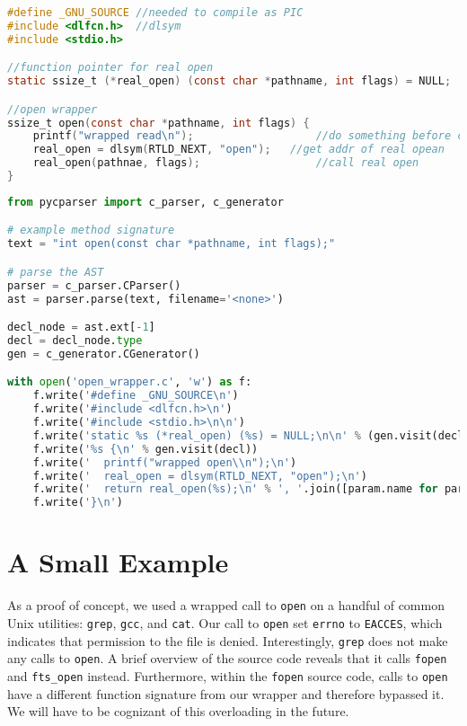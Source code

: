 \documentclass[10pt]{article}
\begin{document}
\begin{lstlisting}[caption=\texttt{open} wrapper, language=C]
#define _GNU_SOURCE	//needed to compile as PIC
#include <dlfcn.h>	//dlsym
#include <stdio.h>

//function pointer for real open
static ssize_t (*real_open) (const char *pathname, int flags) = NULL;

//open wrapper
ssize_t open(const char *pathname, int flags) {
	printf("wrapped read\n");					//do something before calling real open
	real_open = dlsym(RTLD_NEXT, "open"); 	//get addr of real opean
	real_open(pathnae, flags);					//call real open
}
\end{lstlisting}
\begin{lstlisting}[caption=\texttt{gen\_open\_wrapper.py}  Generates code identical to Listing 1, language=Python]
from pycparser import c_parser, c_generator

# example method signature
text = "int open(const char *pathname, int flags);"

# parse the AST
parser = c_parser.CParser()
ast = parser.parse(text, filename='<none>')

decl_node = ast.ext[-1]
decl = decl_node.type
gen = c_generator.CGenerator()

with open('open_wrapper.c', 'w') as f:
    f.write('#define _GNU_SOURCE\n')
    f.write('#include <dlfcn.h>\n')
    f.write('#include <stdio.h>\n\n')
    f.write('static %s (*real_open) (%s) = NULL;\n\n' % (gen.visit(decl.type), ', '.join([gen.visit(param) for param in decl.args.params])))
    f.write('%s {\n' % gen.visit(decl))
    f.write('  printf("wrapped open\\n");\n')
    f.write('  real_open = dlsym(RTLD_NEXT, "open");\n')
    f.write('  return real_open(%s);\n' % ', '.join([param.name for param in decl.args.params]))
    f.write('}\n')
\end{lstlisting}


\section{A Small Example}
As a proof of concept, we used a wrapped call to \texttt{open} on a handful of common Unix utilities: \texttt{grep}, \texttt{gcc}, and \texttt{cat}. Our call to \texttt{open} set \texttt{errno} to \texttt{EACCES}, which indicates that permission to the file is denied. Interestingly, \texttt{grep} does not make any calls to \texttt{open}. A brief overview of the source code reveals that it calls \texttt{fopen} and \texttt{fts\_open} instead. Furthermore, within the \texttt{fopen} source code, calls to \texttt{open} have a different function signature from our wrapper and therefore bypassed it. We will have to be cognizant of this overloading in the future.
\end{document}

